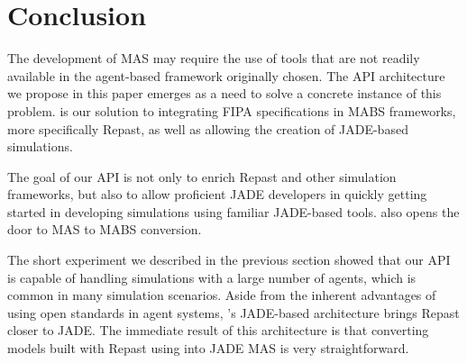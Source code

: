 \section{Conclusion}
\label{sec:conclusion}

The development of MAS may require the use of tools that are not readily available in the agent-based framework originally chosen. The API architecture we propose in this paper emerges as a need to solve a concrete instance of this problem. \apiname{} is our solution to integrating FIPA specifications in MABS frameworks, more specifically Repast, as well as allowing the creation of JADE-based simulations.

The goal of our API is not only to enrich Repast and other simulation frameworks, but also to allow proficient JADE developers in quickly getting started in developing simulations using familiar JADE-based tools. \apiname{} also opens the door to MAS to MABS conversion.

The short experiment we described in the previous section showed that our API is capable of handling simulations with a large number of agents, which is common in many simulation scenarios. Aside from the inherent advantages of using open standards in agent systems, \apiname{}'s JADE-based architecture brings Repast closer to JADE. The immediate result of this architecture is that converting models built with Repast using \apiname{} into JADE MAS is very straightforward.
